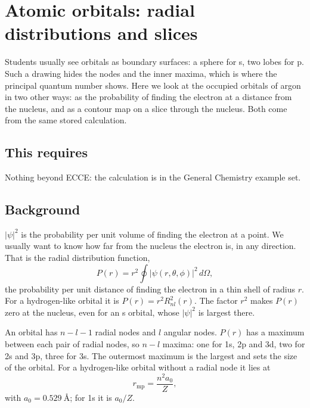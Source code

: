 \chapter{Atomic orbitals: radial distributions and slices}
\label{sec:atomic-orbitals}


Students usually see orbitals as boundary surfaces: a sphere for s, two lobes for p. Such a drawing hides the nodes and the inner maxima, which is where the principal quantum number shows. Here we look at the occupied orbitals of argon in two other ways: as the probability of finding the electron at a distance from the nucleus, and as a contour map on a slice through the nucleus. Both come from the same stored calculation.

\section*{This requires}
Nothing beyond ECCE: the calculation is in the General Chemistry example set.

\section{Background}
$|\psi|^2$ is the probability per unit volume of finding the electron at a point. We usually want to know how far from the nucleus the electron is, in any direction. That is the radial distribution function,
\begin{equation}
	P(r) = r^2 \oint |\psi(r,\theta,\phi)|^2 \, d\Omega ,
	\label{eq:rdf}
\end{equation}
the probability per unit distance of finding the electron in a thin shell of radius $r$. For a hydrogen-like orbital it is $P(r) = r^2 R_{nl}^2(r)$. The factor $r^2$ makes $P(r)$ zero at the nucleus, even for an s orbital, whose $|\psi|^2$ is largest there.

An orbital has $n-l-1$ radial nodes and $l$ angular nodes. $P(r)$ has a maximum between each pair of radial nodes, so $n-l$ maxima: one for 1s, 2p and 3d, two for 2s and 3p, three for 3s. The outermost maximum is the largest and sets the size of the orbital. For a hydrogen-like orbital without a radial node it lies at
\begin{equation}
	r_\mathrm{mp} = \frac{n^2 a_0}{Z},
	\label{eq:rmp}
\end{equation}
with $a_0 = \SI{0.529}{\angstrom}$; for 1s it is $a_0/Z$.

